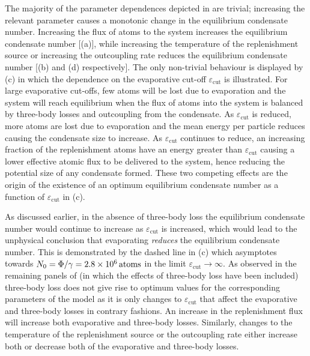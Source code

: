 The majority of the parameter dependences depicted in  are trivial; increasing the relevant parameter causes a monotonic change in the equilibrium condensate number.  Increasing the flux of atoms to the system increases the equilibrium condensate number [(a)], while increasing the temperature of the replenishment source or increasing the outcoupling rate reduces the equilibrium condensate number [(b) and (d) respectively].  The only non-trivial behaviour is displayed by (c) in which the dependence on the evaporative cut-off $\varepsilon_\text{cut}$ is illustrated.  For large evaporative cut-offs, few atoms will be lost due to evaporation and the system will reach equilibrium when the flux of atoms into the system is balanced by three-body losses and outcoupling from the condensate.  As $\varepsilon_\text{cut}$ is reduced, more atoms are lost due to evaporation and the mean energy per particle reduces causing the condensate size to increase.  As $\varepsilon_\text{cut}$ continues to reduce, an increasing fraction of the replenishment atoms have an energy greater than $\varepsilon_\text{cut}$ causing a lower effective atomic flux to be delivered to the system, hence reducing the potential size of any condensate formed.  These two competing effects are the origin of the existence of an optimum equilibrium condensate number as a function of $\varepsilon_\text{cut}$ in (c).

As discussed earlier, in the absence of three-body loss the equilibrium condensate number would continue to increase as $\varepsilon_\text{cut}$ is increased, which would lead to the unphysical conclusion that evaporating \emph{reduces} the equilibrium condensate number.  This is demonstrated by the dashed line in (c) which asymptotes towards $N_0=\Phi/\gamma = \unit[2.8\times 10^6]{atoms}$ in the limit $\varepsilon_\text{cut}\rightarrow \infty$.  As observed in the remaining panels of  (in which the effects of three-body loss have been included) three-body loss does not give rise to optimum values for the corresponding parameters of the model as it is only changes to $\varepsilon_\text{cut}$ that affect the evaporative and three-body losses in contrary fashions.  An increase in the replenishment flux will increase both evaporative and three-body losses.  Similarly, changes to the temperature of the replenishment source or the outcoupling rate either increase both or decrease both of the evaporative and three-body losses.

